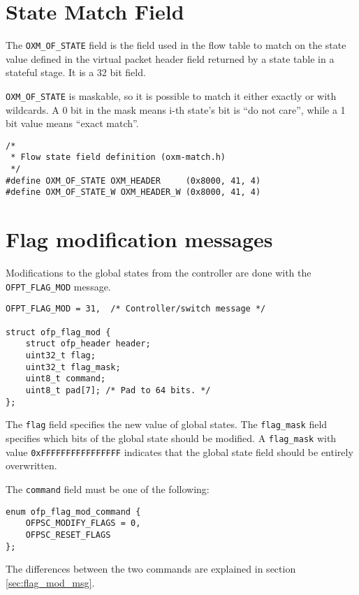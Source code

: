 \section{State Match Field}
\label{sec:match_state}

The \texttt{OXM\_OF\_STATE} field is the field used in the flow table to match on the state value defined in the virtual packet header field returned by a state table in a stateful stage. It is a 32 bit field.

\texttt{OXM\_OF\_STATE} is maskable, so it is possible to match it either exactly or with wildcards. A 0 bit in the mask means i-th state's bit is ``do not care'', while a 1 bit value means ``exact match''.

\begin{verbatim}
/*
 * Flow state field definition (oxm-match.h)
 */
#define OXM_OF_STATE OXM_HEADER     (0x8000, 41, 4)
#define OXM_OF_STATE_W OXM_HEADER_W (0x8000, 41, 4)
\end{verbatim}

\section{Flag modification messages}
\label{sec:flag_mod_msg_proto}
Modifications to the global states from the controller are done with the \texttt{OFPT\_FLAG\_MOD} message.

\begin{verbatim}
OFPT_FLAG_MOD = 31,  /* Controller/switch message */

struct ofp_flag_mod {
    struct ofp_header header;
    uint32_t flag;
    uint32_t flag_mask;
    uint8_t command;
    uint8_t pad[7]; /* Pad to 64 bits. */
};
\end{verbatim}

The \texttt{flag} field specifies the new value of global states. The \texttt{flag\_mask} field specifies which bits of the global state should be modified. A \texttt{flag\_mask} with value \texttt{0xFFFFFFFFFFFFFFFF} indicates that the global state field should be entirely overwritten.

The \texttt{command} field must be one of the following:

\begin{verbatim}
enum ofp_flag_mod_command { 
    OFPSC_MODIFY_FLAGS = 0,
    OFPSC_RESET_FLAGS
};
\end{verbatim}

The differences between the two commands are explained in section \ref{sec:flag_mod_msg}.

